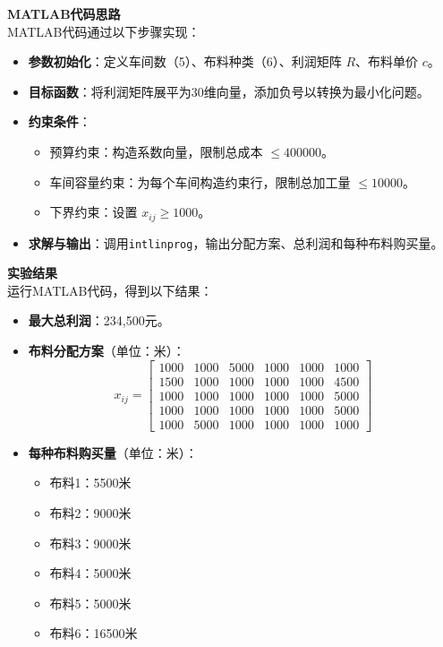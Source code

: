 \textbf{MATLAB代码思路}\\
MATLAB代码通过以下步骤实现：
\begin{itemize}
    \item \textbf{参数初始化}：定义车间数（5）、布料种类（6）、利润矩阵 \( R \)、布料单价 \( c \)。
    \item \textbf{目标函数}：将利润矩阵展平为30维向量，添加负号以转换为最小化问题。
    \item \textbf{约束条件}：
        \begin{itemize}
            \item 预算约束：构造系数向量，限制总成本 \(\leq 400000\)。
            \item 车间容量约束：为每个车间构造约束行，限制总加工量 \(\leq 10000\)。
            \item 下界约束：设置 \( x_{ij} \geq 1000 \)。
        \end{itemize}
    \item \textbf{求解与输出}：调用\texttt{intlinprog}，输出分配方案、总利润和每种布料购买量。
\end{itemize}

\textbf{实验结果}\\
运行MATLAB代码，得到以下结果：
\begin{itemize}
    \item \textbf{最大总利润}：234,500元。
    \item \textbf{布料分配方案}（单位：米）：
    \[
    x_{ij} = \begin{bmatrix}
    1000 & 1000 & 5000 & 1000 & 1000 & 1000 \\
    1500 & 1000 & 1000 & 1000 & 1000 & 4500 \\
    1000 & 1000 & 1000 & 1000 & 1000 & 5000 \\
    1000 & 1000 & 1000 & 1000 & 1000 & 5000 \\
    1000 & 5000 & 1000 & 1000 & 1000 & 1000
    \end{bmatrix}
    \]
    \item \textbf{每种布料购买量}（单位：米）：
    \begin{itemize}
        \item 布料1：5500米
        \item 布料2：9000米
        \item 布料3：9000米
        \item 布料4：5000米
        \item 布料5：5000米
        \item 布料6：16500米
    \end{itemize}
\end{itemize}

